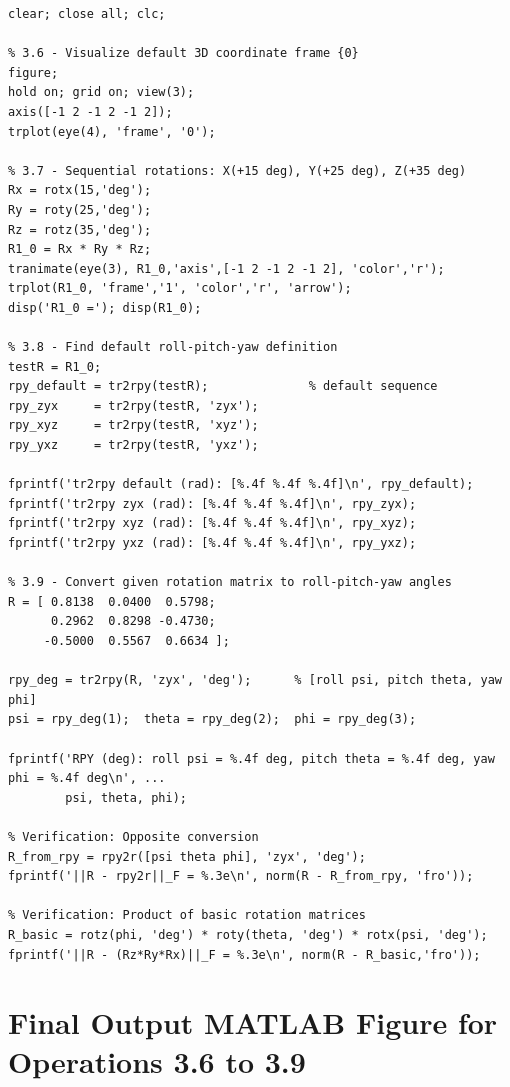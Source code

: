 \documentclass[11pt,a4paper]{article}
\begin{document}
\begin{lstlisting}[style=matlab, caption={Task 2 MATLAB Code (3.6-3.9)}]
clear; close all; clc;

% 3.6 - Visualize default 3D coordinate frame {0}
figure;
hold on; grid on; view(3);
axis([-1 2 -1 2 -1 2]);
trplot(eye(4), 'frame', '0');

% 3.7 - Sequential rotations: X(+15 deg), Y(+25 deg), Z(+35 deg)
Rx = rotx(15,'deg');
Ry = roty(25,'deg');   
Rz = rotz(35,'deg');   
R1_0 = Rx * Ry * Rz;
tranimate(eye(3), R1_0,'axis',[-1 2 -1 2 -1 2], 'color','r');
trplot(R1_0, 'frame','1', 'color','r', 'arrow');
disp('R1_0 ='); disp(R1_0);

% 3.8 - Find default roll-pitch-yaw definition
testR = R1_0;
rpy_default = tr2rpy(testR);              % default sequence
rpy_zyx     = tr2rpy(testR, 'zyx');
rpy_xyz     = tr2rpy(testR, 'xyz');
rpy_yxz     = tr2rpy(testR, 'yxz');

fprintf('tr2rpy default (rad): [%.4f %.4f %.4f]\n', rpy_default);
fprintf('tr2rpy zyx (rad): [%.4f %.4f %.4f]\n', rpy_zyx);
fprintf('tr2rpy xyz (rad): [%.4f %.4f %.4f]\n', rpy_xyz);
fprintf('tr2rpy yxz (rad): [%.4f %.4f %.4f]\n', rpy_yxz);

% 3.9 - Convert given rotation matrix to roll-pitch-yaw angles
R = [ 0.8138  0.0400  0.5798;
      0.2962  0.8298 -0.4730;
     -0.5000  0.5567  0.6634 ];

rpy_deg = tr2rpy(R, 'zyx', 'deg');      % [roll psi, pitch theta, yaw phi]
psi = rpy_deg(1);  theta = rpy_deg(2);  phi = rpy_deg(3);

fprintf('RPY (deg): roll psi = %.4f deg, pitch theta = %.4f deg, yaw phi = %.4f deg\n', ...
        psi, theta, phi);

% Verification: Opposite conversion
R_from_rpy = rpy2r([psi theta phi], 'zyx', 'deg');
fprintf('||R - rpy2r||_F = %.3e\n', norm(R - R_from_rpy, 'fro'));

% Verification: Product of basic rotation matrices
R_basic = rotz(phi, 'deg') * roty(theta, 'deg') * rotx(psi, 'deg');
fprintf('||R - (Rz*Ry*Rx)||_F = %.3e\n', norm(R - R_basic,'fro'));
\end{lstlisting}

\section{Final Output MATLAB Figure for Operations 3.6 to 3.9}
\end{document}
